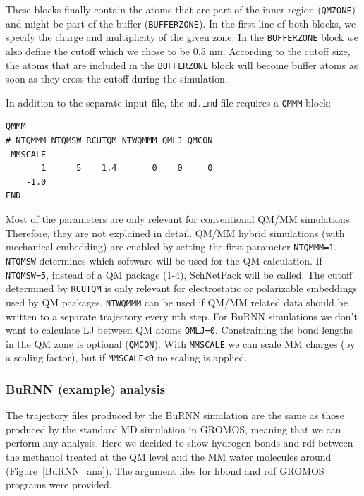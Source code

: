 These blocks finally contain the atoms that are part of the inner region (\texttt{QMZONE}) and might be part of the buffer (\texttt{BUFFERZONE}). In the first line of both blocks, we specify the charge and multiplicity of the given zone. In the \texttt{BUFFERZONE} block we also define the cutoff which we chose to be 0.5 nm. According to the cutoff size, the atoms that are included in the \texttt{BUFFERZONE} block will become buffer atoms as soon as they cross the cutoff during the simulation.

In addition to the separate input file, the \texttt{md.imd} file requires a \texttt{QMMM} block:
\begin{lstlisting}[breaklines=true, breakatwhitespace=false]
QMMM
# NTQMMM NTQMSW RCUTQM NTWQMMM QMLJ QMCON      
 MMSCALE
       1      5    1.4       0    0     0
    -1.0
END
\end{lstlisting}

Most of the parameters are only relevant for conventional QM/MM simulations. Therefore, they are not explained in detail.
QM/MM hybrid simulations (with mechanical embedding) are enabled by setting the first parameter \texttt{NTQMMM=1}. \texttt{NTQMSW} determines which software will be used for the QM calculation. If \texttt{NTQMSW=5}, instead of a QM package (1-4), SchNetPack will be called. The cutoff determined by \texttt{RCUTQM} is only relevant for electrostatic or polarizable embeddings used by QM packages. \texttt{NTWQMMM} can be used if QM/MM related data should be written to a separate trajectory every nth step. For BuRNN simulations we don't want to calculate LJ between QM atoms \texttt{QMLJ=0}. Constraining the bond lengths in the QM zone is optional (\texttt{QMCON}). With \texttt{MMSCALE} we can scale MM charges (by a scaling factor), but if \texttt{MMSCALE<0} no scaling is applied.


\subsubsection{BuRNN (example) analysis}
The trajectory files produced by the BuRNN simulation are the same as those produced by the standard MD simulation in GROMOS, meaning that we can perform any analysis. Here we decided to show hydrogen bonds and rdf between the methanol treated at the QM level and the MM water molecules around (Figure~\ref{BuRNN_ana}). The argument files for \href{https://github.com/LierB/gromos_tutorial_livecoms/blob/burnn_tutorial_rc/tutorial_files/t_06/md_burnn/ana/hbond/hbond_meoh.arg}{hbond} and \href{https://github.com/LierB/gromos_tutorial_livecoms/blob/burnn_tutorial_rc/tutorial_files/t_06/md_burnn/ana/rdf/rdf_ob_ow.arg}{rdf} GROMOS programs were provided.

